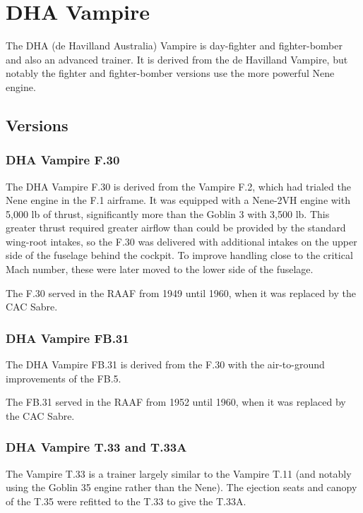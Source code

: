 \section{DHA Vampire}

The DHA (de Havilland Australia) Vampire is day-fighter and fighter-bomber and also an advanced trainer. It is derived from the de Havilland Vampire, but notably the fighter and fighter-bomber versions use the more powerful Nene engine.

\subsection{Versions}

\subsubsection{DHA Vampire F.30}

The DHA Vampire F.30 is derived from the Vampire F.2, which had trialed the Nene engine in the F.1 airframe. It was equipped with a Nene-2VH engine with 5,000 lb of thrust, significantly more than the Goblin 3 with 3,500 lb. This greater thrust required greater airflow than could be provided by the standard wing-root intakes, so the F.30 was delivered with additional intakes on the upper side of the fuselage behind the cockpit. To improve handling close to the critical Mach number, these were later moved to the lower side of the fuselage.

The F.30 served in the RAAF from 1949 until 1960, when it was replaced by the CAC Sabre. 

\subsubsection{DHA Vampire FB.31}

The DHA Vampire FB.31 is derived from the F.30 with the air-to-ground improvements of the FB.5.

The FB.31 served in the RAAF from  1952 until 1960, when it was replaced by the CAC Sabre.

\subsubsection{DHA Vampire T.33 and T.33A}

The Vampire T.33 is a trainer largely similar to the Vampire T.11 (and notably using the Goblin 35 engine rather than the Nene). The ejection seats and canopy of the T.35 were refitted to the T.33 to give the T.33A.

